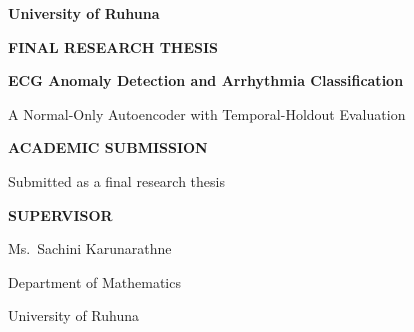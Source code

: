 
\begin{titlepage}\label{title}
\thispagestyle{empty}
{}%
%

\sffamily
\noindent{\color{thesisteal}\rule{\textwidth}{2pt}}

\vspace{0.75cm}

\noindent
{\color{thesisnavy}\Large\bfseries University of Ruhuna}\par
\vspace{0.12cm}

\vspace{2.2cm}

\noindent
{\color{thesisteal}\small\bfseries\MakeUppercase{Final Research Thesis}}\par
\vspace{0.45cm}

\noindent
\parbox{\textwidth}{%
  \raggedright\color{thesisnavy}\fontsize{31}{37}\selectfont\bfseries
  ECG Anomaly Detection and Arrhythmia Classification}

\vspace{0.65cm}
\noindent{\color{thesisteal}\rule{30mm}{1.5pt}}
\vspace{0.55cm}

\noindent
\parbox{0.92\textwidth}{%
  \raggedright\color{thesisslate}\LARGE
  A Normal-Only Autoencoder with Temporal-Holdout Evaluation}

\vspace{1.8cm}

\par
\vspace{0.12cm}

\vfill

\noindent
\begin{minipage}[t]{0.48\textwidth}
  {\color{thesisnavy}\small\bfseries\MakeUppercase{Academic submission}}\par
  \vspace{0.18cm}
  \color{thesisslate}\normalsize
  Submitted as a final research thesis
\end{minipage}%
\hfill
\begin{minipage}[t]{0.43\textwidth}
  {\color{thesisnavy}\small\bfseries\MakeUppercase{Supervisor}}\par
  \vspace{0.18cm}
  \color{thesisslate}\normalsize
  Ms.\ Sachini Karunarathne\par
  Department of Mathematics\par
  University of Ruhuna
\end{minipage}


\end{titlepage}
